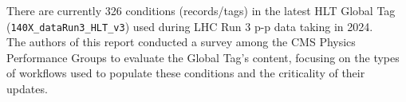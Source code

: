 There are currently 326 conditions (records/tags) in the latest HLT Global Tag (\texttt{140X\_dataRun3\_HLT\_v3}) used during LHC Run 3 p-p data taking in 2024.\\
 The authors of this report conducted a survey among the CMS Physics Performance Groups to evaluate the Global Tag's content, focusing on the types of workflows used to populate these conditions and the criticality of their updates.


